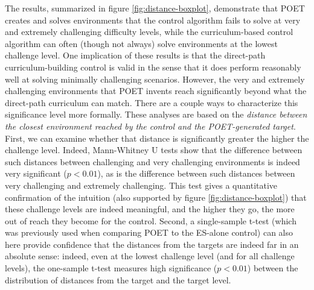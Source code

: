 \documentclass{article}
\newcommand{\todo}[1]{\comments{\textcolor{red}{[TODO: #1]}}}
\newcommand{\jc}[1]{\comments{\textcolor{deepForestGreen}{[JC: #1]}}}
\newcommand{\ks}[1]{\comments{\textcolor{purple}{[Ken: #1]}}}
\newcommand{\rw}[1]{\comments{\textcolor{blue}{[Rui: #1]}}}
\newcommand{\comments}[1]{#1}
\begin{document}
The results, summarized in figure \ref{fig:distance-boxplot}, demonstrate that POET creates and solves environments that the control algorithm fails to solve at very and extremely challenging difficulty levels, while the curriculum-based control algorithm can often (though not always) solve environments at the lowest challenge level. 
One implication of these results is that the direct-path curriculum-building control is valid in the sense that it does perform reasonably well at solving minimally challenging scenarios.  However, the very and extremely challenging environments that POET invents reach significantly beyond what the direct-path curriculum can match.
There are a couple ways to characterize this significance level more formally.   These analyses are based on the \emph{distance between the closest environment reached by the control and the POET-generated target}.  First, we can examine whether that distance is significantly greater the higher the challenge level.  Indeed, Mann-Whitney U tests 
show that the difference between such distances between challenging and very challenging environments is indeed very significant ($p < 0.01$), as is the difference between such distances between very challenging and extremely challenging.  This test gives a quantitative confirmation of the intuition (also supported by figure \ref{fig:distance-boxplot}) that these challenge levels are indeed meaningful, and the higher they go, the more out of reach they become for the control.  Second, 
a single-sample t-test (which was previously used when comparing POET to the ES-alone control)
can also here provide confidence that the distances from the targets are indeed far in an absolute sense: indeed, even at the lowest challenge level (and for all challenge levels), the one-sample t-test measures high significance ($p < 0.01$) between the distribution of distances from the target and the target level.

\end{document}
